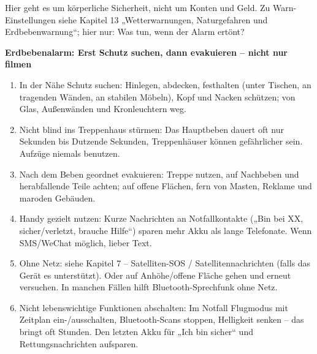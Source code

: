 


Hier geht es um körperliche Sicherheit, nicht um Konten und Geld. Zu Warn-Einstellungen siehe Kapitel 13 „Wetterwarnungen, Naturgefahren und Erdbebenwarnung“; hier nur: Was tun, wenn der Alarm ertönt?

\textbf{Erdbebenalarm: Erst Schutz suchen, dann evakuieren – nicht nur filmen}\par

\begin{enumerate}
  \item In der Nähe Schutz suchen: Hinlegen, abdecken, festhalten (unter Tischen, an tragenden Wänden, an stabilen Möbeln), Kopf und Nacken schützen; von Glas, Außenwänden und Kronleuchtern weg.
  \item Nicht blind ins Treppenhaus stürmen: Das Hauptbeben dauert oft nur Sekunden bis Dutzende Sekunden, Treppenhäuser können gefährlicher sein. Aufzüge niemals benutzen.
  \item Nach dem Beben geordnet evakuieren: Treppe nutzen, auf Nachbeben und herabfallende Teile achten; auf offene Flächen, fern von Masten, Reklame und maroden Gebäuden.
  \item Handy gezielt nutzen: Kurze Nachrichten an Notfallkontakte („Bin bei XX, sicher/verletzt, brauche Hilfe“) sparen mehr Akku als lange Telefonate. Wenn SMS/WeChat möglich, lieber Text.
  \item Ohne Netz: siehe Kapitel 7 – Satelliten-SOS / Satellitennachrichten (falls das Gerät es unterstützt). Oder auf Anhöhe/offene Fläche gehen und erneut versuchen. In manchen Fällen hilft Bluetooth-Sprechfunk ohne Netz.
  \item Nicht lebenswichtige Funktionen abschalten: Im Notfall Flugmodus mit Zeitplan ein-/ausschalten, Bluetooth-Scans stoppen, Helligkeit senken – das bringt oft Stunden. Den letzten Akku für „Ich bin sicher“ und Rettungsnachrichten aufsparen.
\end{enumerate}

